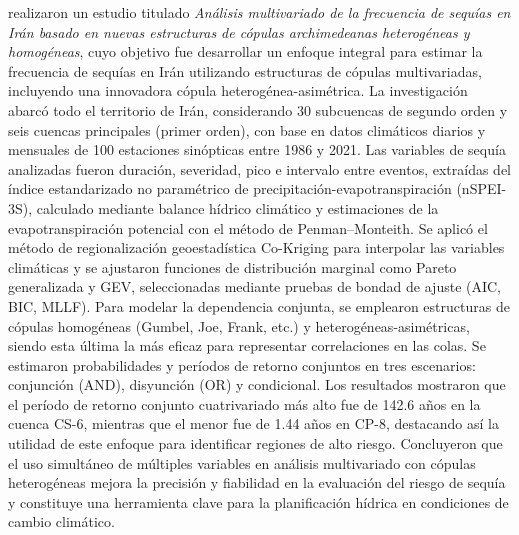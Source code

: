 \textcite{Alizadeh2025} realizaron un estudio titulado \emph{Análisis multivariado de la frecuencia de sequías en Irán basado en nuevas estructuras de cópulas archimedeanas heterogéneas y homogéneas}, cuyo objetivo fue desarrollar un enfoque integral para estimar la frecuencia de sequías en Irán utilizando estructuras de cópulas multivariadas, incluyendo una innovadora cópula heterogénea-asimétrica. La investigación abarcó todo el territorio de Irán, considerando 30 subcuencas de segundo orden y seis cuencas principales (primer orden), con base en datos climáticos diarios y mensuales de 100 estaciones sinópticas entre 1986 y 2021. Las variables de sequía analizadas fueron duración, severidad, pico e intervalo entre eventos, extraídas del índice estandarizado no paramétrico de precipitación-evapotranspiración (nSPEI-3S), calculado mediante balance hídrico climático y estimaciones de la evapotranspiración potencial con el método de Penman–Monteith. Se aplicó el método de regionalización geoestadística Co-Kriging para interpolar las variables climáticas y se ajustaron funciones de distribución marginal como Pareto generalizada y GEV, seleccionadas mediante pruebas de bondad de ajuste (AIC, BIC, MLLF). Para modelar la dependencia conjunta, se emplearon estructuras de cópulas homogéneas (Gumbel, Joe, Frank, etc.) y heterogéneas-asimétricas, siendo esta última la más eficaz para representar correlaciones en las colas. Se estimaron probabilidades y períodos de retorno conjuntos en tres escenarios: conjunción (AND), disyunción (OR) y condicional. Los resultados mostraron que el período de retorno conjunto cuatrivariado más alto fue de 142.6 años en la cuenca CS-6, mientras que el menor fue de 1.44 años en CP-8, destacando así la utilidad de este enfoque para identificar regiones de alto riesgo. Concluyeron que el uso simultáneo de múltiples variables en análisis multivariado con cópulas heterogéneas mejora la precisión y fiabilidad en la evaluación del riesgo de sequía y constituye una herramienta clave para la planificación hídrica en condiciones de cambio climático.

